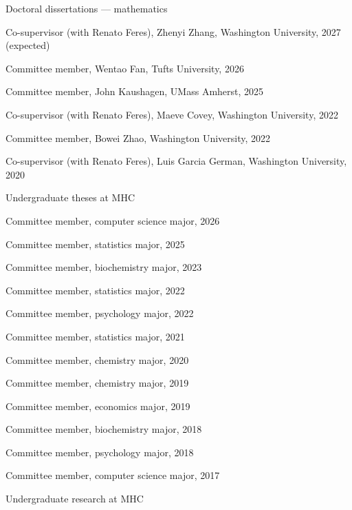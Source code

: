 \documentclass[10pt,letterpaper]{article}
\renewenvironment{itemize}{
  \begin{list}{}{
    \setlength{\leftmargin}{1.5em}
    \setlength{\itemsep}{0.25em}
    \setlength{\parskip}{0pt}
    \setlength{\parsep}{0.25em}
  }
}{
  \end{list}
}
\providecommand{\tightlist}{%
  \setlength{\itemsep}{0pt}\setlength{\parskip}{0pt}}
\let\tightlist\relax
\begin{document}
\begin{itemize}
\tightlist
\item
  Doctoral dissertations --- mathematics

  \begin{itemize}
  \tightlist
  \item
    Co-supervisor (with Renato Feres), Zhenyi Zhang, Washington
    University, 2027 (expected)
  \item
    Committee member, Wentao Fan, Tufts University, 2026
  \item
    Committee member, John Kaushagen, UMass Amherst, 2025
  \item
    Co-supervisor (with Renato Feres), Maeve Covey, Washington
    University, 2022
  \item
    Committee member, Bowei Zhao, Washington University, 2022
  \item
    Co-supervisor (with Renato Feres), Luis Garcia German, Washington
    University, 2020
  \end{itemize}
\item
  Undergraduate theses at MHC

  \begin{itemize}
  \tightlist
  \item
    Committee member, computer science major, 2026
  \item
    Committee member, statistics major, 2025
  \item
    Committee member, biochemistry major, 2023
  \item
    Committee member, statistics major, 2022
  \item
    Committee member, psychology major, 2022
  \item
    Committee member, statistics major, 2021
  \item
    Committee member, chemistry major, 2020
  \item
    Committee member, chemistry major, 2019
  \item
    Committee member, economics major, 2019
  \item
    Committee member, biochemistry major, 2018
  \item
    Committee member, psychology major, 2018
  \item
    Committee member, computer science major, 2017
  \end{itemize}
\item
  Undergraduate research at MHC


\end{itemize}
\end{document}
